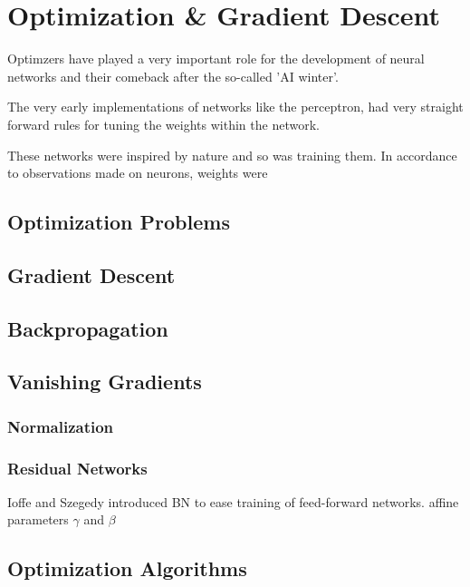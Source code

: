 \setchapterpreamble[u]{\margintoc}
\chapter{Optimization \& Gradient Descent}

Optimzers have played a very important role for the development of neural networks and their comeback after the so-called 'AI winter'.

The very early implementations of networks like the perceptron, had very straight forward rules for tuning the weights within the network.

These networks were inspired by nature and so was training them.
In accordance to observations made on neurons, weights were 

\section{Optimization Problems}


\section{Gradient Descent}

\section{Backpropagation}


\section{Vanishing Gradients}
\subsection{Normalization}
\subsection{Residual Networks}
Ioffe and Szegedy introduced BN to ease training of feed-forward networks.
affine parameters $\gamma$ and $\beta$


\section{Optimization Algorithms}
